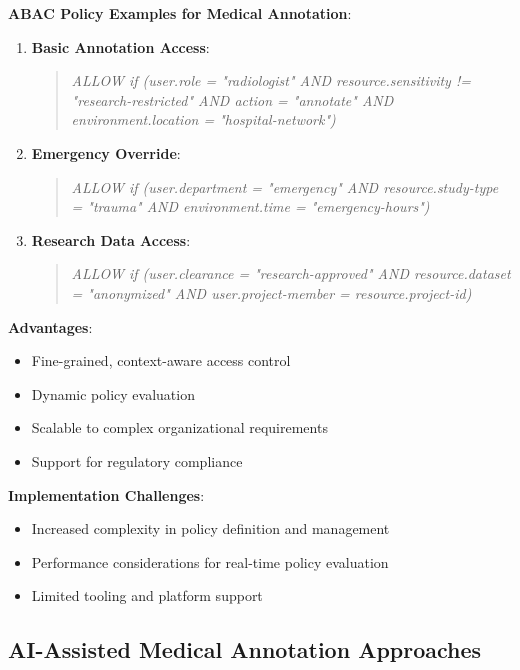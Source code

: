 \textbf{ABAC Policy Examples for Medical Annotation}:

\begin{enumerate}
    \item \textbf{Basic Annotation Access}:
    \begin{quote}
    \textit{ALLOW if (user.role = "radiologist" AND resource.sensitivity != "research-restricted" AND action = "annotate" AND environment.location = "hospital-network")}
    \end{quote}
    
    \item \textbf{Emergency Override}:
    \begin{quote}
    \textit{ALLOW if (user.department = "emergency" AND resource.study-type = "trauma" AND environment.time = "emergency-hours")}
    \end{quote}
    
    \item \textbf{Research Data Access}:
    \begin{quote}
    \textit{ALLOW if (user.clearance = "research-approved" AND resource.dataset = "anonymized" AND user.project-member = resource.project-id)}
    \end{quote}
\end{enumerate}

\textbf{Advantages}:
\begin{itemize}
    \item Fine-grained, context-aware access control
    \item Dynamic policy evaluation
    \item Scalable to complex organizational requirements
    \item Support for regulatory compliance
\end{itemize}

\textbf{Implementation Challenges}:
\begin{itemize}
    \item Increased complexity in policy definition and management
    \item Performance considerations for real-time policy evaluation
    \item Limited tooling and platform support
\end{itemize}

\subsection{AI-Assisted Medical Annotation Approaches}
\label{subsec:ai-assisted-annotation}

